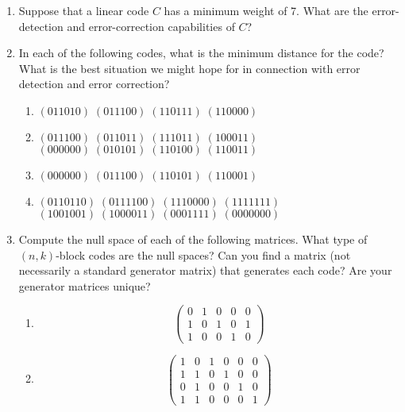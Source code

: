 {\begin{enumerate}
 
 
 
\item  %
Suppose that a linear code $C$ has a minimum weight of 7. What are the
error-detection and error-correction capabilities of $C$?
 
 
\item
In each of the following codes, what is the minimum distance for the
code? What is the best situation we might hope for in connection with
error detection and error correction? 
\begin{enumerate}
 
 \item
$(011010) \; (011100) \; (110111) \; (110000)$
 
 \item
$(011100) \; (011011) \; (111011) \; (100011)$ \\
$(000000) \; (010101) \; (110100) \; (110011)$
 
 \item
$(000000) \; (011100) \; (110101) \; (110001)$
 
 \item
$(0110110) \; (0111100) \; (1110000) \; (1111111)$ \\
$(1001001) \; (1000011) \; (0001111) \; (0000000)$
 
\end{enumerate}
 

 
\item
Compute the null space of each of the following matrices.  What type
of $(n,k)$-block codes are the null spaces? Can you find a matrix (not
necessarily a standard generator matrix) that generates each code?
Are your generator matrices unique?
\begin{multicols}{2}
\begin{enumerate}

\item
\[
\begin{pmatrix}
0 & 1 & 0 & 0 & 0 \\
1 & 0 & 1 & 0 & 1 \\
1 & 0 & 0 & 1 & 0
\end{pmatrix}
\]

\item
\[
\begin{pmatrix}
1 & 0 & 1 & 0 & 0 & 0 \\
1 & 1 & 0 & 1 & 0 & 0 \\
0 & 1 & 0 & 0 & 1 & 0 \\
1 & 1 & 0 & 0 & 0 & 1
\end{pmatrix}
\]


\end{enumerate}
\end{multicols}
\end{enumerate}}
